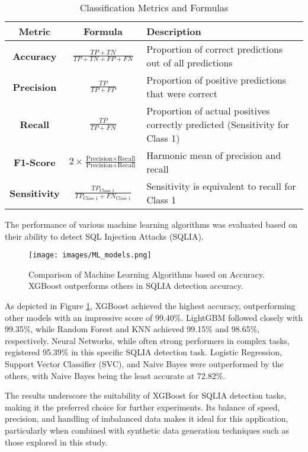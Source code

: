 \documentclass[journal]{IEEEtran}
\begin{document}
\begin{table}[H]
\centering
\caption{Classification Metrics and Formulas}
\begin{tabular}{|c|c|p{3.5 cm}|}
\hline
\textbf{Metric} & \textbf{Formula} & \textbf{Description} \\ \hline
\textbf{Accuracy} & 
$\frac{TP + TN}{TP + TN + FP + FN}$ & 
Proportion of correct predictions out of all predictions \\ \hline
\textbf{Precision} & 
$\frac{TP}{TP + FP}$ & 
Proportion of positive predictions that were correct \\ \hline
\textbf{Recall} & 
$\frac{TP}{TP + FN}$ & 
Proportion of actual positives correctly predicted (Sensitivity for Class 1) \\ \hline
\textbf{F1-Score} & 
$2 \times \frac{\text{Precision} \times \text{Recall}}{\text{Precision} + \text{Recall}}$ & 
Harmonic mean of precision and recall \\ \hline
\textbf{Sensitivity} & 
$\frac{TP_{\text{Class 1}}}{TP_{\text{Class 1}} + FN_{\text{Class 1}}}$ & 
Sensitivity is equivalent to recall for Class 1 \\ \hline
\end{tabular}
\end{table}

The performance of various machine learning algorithms was evaluated based on their ability to detect SQL Injection Attacks (SQLIA). 

\begin{figure}[H]
    \centering
    \texttt{[image: images/ML\_models.png]}
    \caption{Comparison of Machine Learning Algorithms based on Accuracy. XGBoost outperforms others in SQLIA detection accuracy.}
    \label{fig:ML_models_accuracy}
\end{figure}

As depicted in Figure \ref{fig:ML_models_accuracy}, XGBoost achieved the highest accuracy, outperforming other models with an impressive score of 99.40\%. LightGBM followed closely with 99.35\%, while Random Forest and KNN achieved 99.15\% and 98.65\%, respectively. Neural Networks, while often strong performers in complex tasks, registered 95.39\% in this specific SQLIA detection task. Logistic Regression, Support Vector Classifier (SVC), and Naive Bayes were outperformed by the others, with Naive Bayes being the least accurate at 72.82\%.

The results underscore the suitability of XGBoost for SQLIA detection tasks, making it the preferred choice for further experiments. Its balance of speed, precision, and handling of imbalanced data makes it ideal for this application, particularly when combined with synthetic data generation techniques such as those explored in this study.
\end{document}
